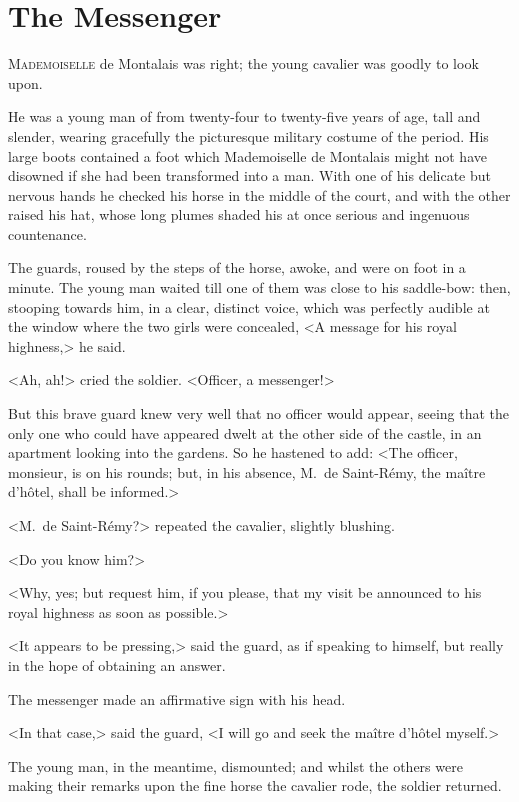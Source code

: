 \chapter{The Messenger}

\lettrine{M}{ademoiselle} de Montalais was right; the young cavalier was goodly to look upon.

\zz
He was a young man of from twenty-four to twenty-five years of age, tall and slender, wearing gracefully the picturesque military costume of the period. His large boots contained a foot which Mademoiselle de Montalais might not have disowned if she had been transformed into a man. With one of his delicate but nervous hands he checked his horse in the middle of the court, and with the other raised his hat, whose long plumes shaded his at once serious and ingenuous countenance.

The guards, roused by the steps of the horse, awoke, and were on foot in a minute. The young man waited till one of them was close to his saddle-bow: then, stooping towards him, in a clear, distinct voice, which was perfectly audible at the window where the two girls were concealed, <A message for his royal highness,> he said.

<Ah, ah!> cried the soldier. <Officer, a messenger!>

But this brave guard knew very well that no officer would appear, seeing that the only one who could have appeared dwelt at the other side of the castle, in an apartment looking into the gardens. So he hastened to add: <The officer, monsieur, is on his rounds; but, in his absence, M.~de Saint-Rémy, the maître d'hôtel, shall be informed.>

<M.~de Saint-Rémy?> repeated the cavalier, slightly blushing.

<Do you know him?>

<Why, yes; but request him, if you please, that my visit be announced to his royal highness as soon as possible.>

<It appears to be pressing,> said the guard, as if speaking to himself, but really in the hope of obtaining an answer.

The messenger made an affirmative sign with his head.

<In that case,> said the guard, <I will go and seek the maître d'hôtel myself.>

The young man, in the meantime, dismounted; and whilst the others were making their remarks upon the fine horse the cavalier rode, the soldier returned.

